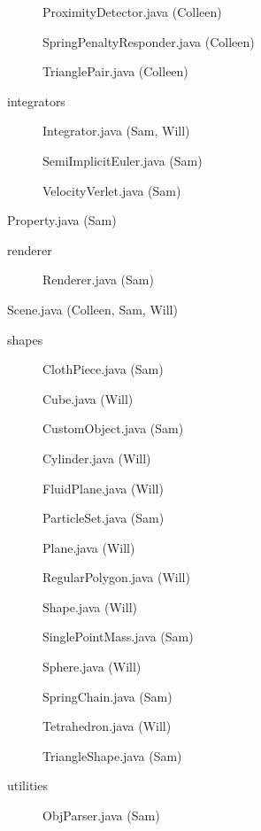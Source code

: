 \begin{description}
\begin{description}
\begin{description}
\begin{description}
      \item[] ProximityDetector.java (Colleen)
      \item[] SpringPenaltyResponder.java (Colleen)
      \item[] TrianglePair.java (Colleen)
      \end{description}
    \item[] integrators
      \begin{description}
      \item[] Integrator.java (Sam, Will)
      \item[] SemiImplicitEuler.java (Sam)
      \item[] VelocityVerlet.java (Sam)
      \end{description}
    \item[] Property.java (Sam)
    \end{description}
  \item[] renderer
    \begin{description}
    \item[] Renderer.java (Sam)
    \end{description}
  \item[] Scene.java (Colleen, Sam, Will)
  \item[] shapes
    \begin{description}
    \item[] ClothPiece.java (Sam)
    \item[] Cube.java (Will)
    \item[] CustomObject.java (Sam)
    \item[] Cylinder.java (Will)
    \item[] FluidPlane.java (Will)
    \item[] ParticleSet.java (Sam)
    \item[] Plane.java (Will) 
    \item[] RegularPolygon.java (Will)
    \item[] Shape.java (Will)
    \item[] SinglePointMass.java (Sam)
    \item[] Sphere.java (Will)
    \item[] SpringChain.java (Sam)
    \item[] Tetrahedron.java (Will)
    \item[] TriangleShape.java (Sam)
    \end{description}
  \item[] utilities
    \begin{description}
    \item[] ObjParser.java (Sam)

\end{description}
\end{description}
\end{description}
